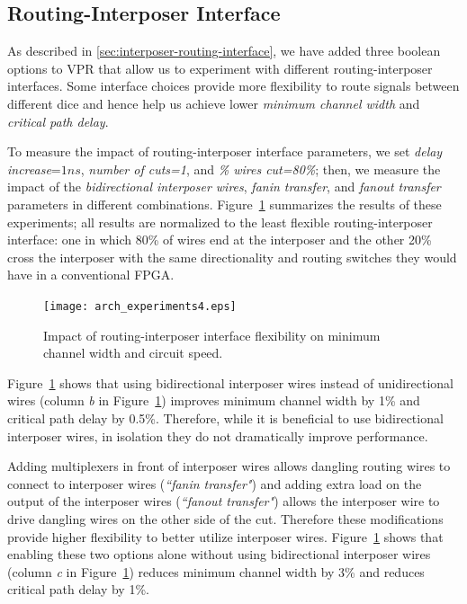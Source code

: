 \documentclass[journal]{IEEEtran}
\begin{document}
\subsection{Routing-Interposer Interface}
As described in \ref{sec:interposer-routing-interface}, we have added three boolean options to VPR that allow us to experiment with different routing-interposer interfaces. Some interface choices provide more flexibility to route signals between different dice and hence help us achieve lower \textit{minimum channel width} and \textit{critical path delay}.

To measure the impact of routing-interposer interface parameters, we set \textit{delay increase}=$1ns$, \textit{number of cuts=1}, and \textit{\% wires cut=80\%}; then, we measure the impact of the \textit{bidirectional interposer wires}, \textit{fanin transfer}, and \textit{fanout transfer} parameters in different combinations. Figure~\ref{fig:all_arch_experiments} summarizes the results of these experiments; all results are normalized to the least flexible routing-interposer interface: one in which 80\% of wires end at the interposer and the other 20\% cross the interposer with the same directionality and routing switches they would have in a conventional FPGA.

\begin{figure}[!h]
\centering
\texttt{[image: arch\_experiments4.eps]}
\caption{Impact of routing-interposer interface flexibility on minimum channel width and circuit speed.}
\label{fig:all_arch_experiments}
\end{figure}

Figure~\ref{fig:all_arch_experiments} shows that using bidirectional interposer wires instead of unidirectional wires (column \textit{b} in Figure~\ref{fig:all_arch_experiments}) improves minimum channel width by 1\% and critical path delay by 0.5\%. Therefore, while it is beneficial to use bidirectional interposer wires, in isolation they do not dramatically improve performance.

Adding multiplexers in front of interposer wires allows dangling routing wires to connect to interposer wires (\textit{``fanin transfer"}) and adding extra load on the output of the interposer wires (\textit{``fanout transfer"}) allows the interposer wire to drive dangling wires on the other side of the cut. Therefore these modifications provide higher flexibility to better utilize interposer wires. Figure~\ref{fig:all_arch_experiments} shows that enabling these two options alone without using bidirectional interposer wires (column \textit{c} in Figure~\ref{fig:all_arch_experiments}) reduces minimum channel width by 3\% and reduces critical path delay by 1\%. 
\end{document}
